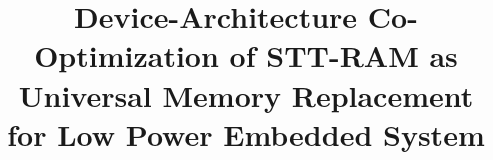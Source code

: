 \documentclass[10pt,letterpaper,conference]{IEEEtran}
\begin{document}
\title{Device-Architecture Co-Optimization of STT-RAM as Universal Memory Replacement for Low Power Embedded System\vspace{-10pt}}

\maketitle












\end{document}
